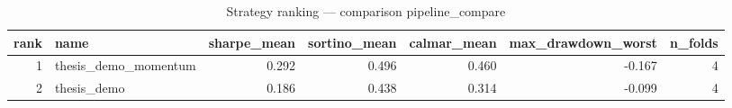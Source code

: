 \begin{table}
\caption{Strategy ranking — comparison pipeline_compare}
\label{tab:ranking_pipeline_compare}
\begin{tabular}{rlrrrrr}
\toprule
rank & name & sharpe_mean & sortino_mean & calmar_mean & max_drawdown_worst & n_folds \\
\midrule
1 & thesis_demo_momentum & 0.292 & 0.496 & 0.460 & -0.167 & 4 \\
2 & thesis_demo & 0.186 & 0.438 & 0.314 & -0.099 & 4 \\
\bottomrule
\end{tabular}
\end{table}
